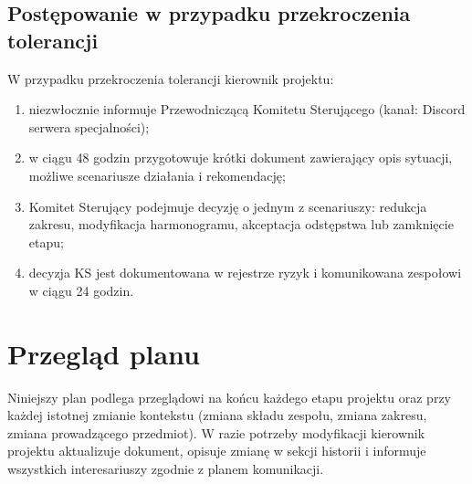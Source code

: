 \documentclass[11pt,a4paper]{article}
\begin{document}
	\subsection{Postępowanie w przypadku przekroczenia tolerancji}
	W przypadku przekroczenia tolerancji kierownik projektu:
	\begin{enumerate}[noitemsep]
		\item niezwłocznie informuje Przewodniczącą Komitetu Sterującego (kanał: Discord serwera specjalności);
		\item w ciągu 48 godzin przygotowuje krótki dokument zawierający opis sytuacji, możliwe scenariusze działania i rekomendację;
		\item Komitet Sterujący podejmuje decyzję o jednym z scenariuszy: redukcja zakresu, modyfikacja harmonogramu, akceptacja odstępstwa lub zamknięcie etapu;
		\item decyzja KS jest dokumentowana w rejestrze ryzyk i komunikowana zespołowi w ciągu 24 godzin.
	\end{enumerate}
	
	\section{Przegląd planu}\label{sec:przeglad}
	
	\noindent Niniejszy plan podlega przeglądowi na końcu każdego etapu projektu oraz przy każdej
	istotnej zmianie kontekstu (zmiana składu zespołu, zmiana zakresu, zmiana prowadzącego
	przedmiot). W razie potrzeby modyfikacji kierownik projektu aktualizuje dokument, opisuje
	zmianę w sekcji historii i informuje wszystkich interesariuszy zgodnie z planem komunikacji.
	
\end{document}

